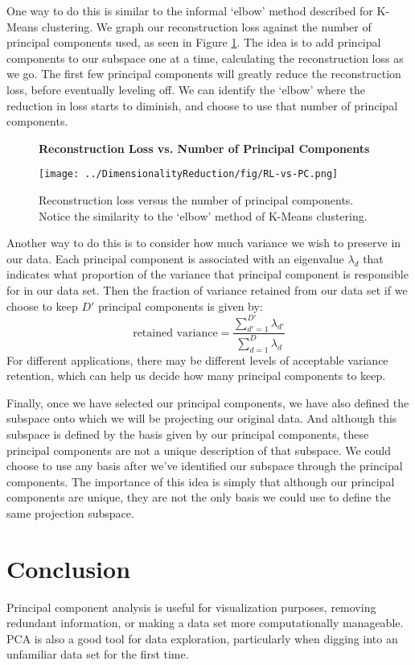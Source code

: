 One way to do this is similar to the informal `elbow' method described for K-Means clustering. We graph our reconstruction loss against the number of principal components used, as seen in Figure \ref{fig:RL-vs-PC}. The idea is to add principal components to our subspace one at a time, calculating the reconstruction loss as we go. The first few principal components will greatly reduce the reconstruction loss, before eventually leveling off. We can identify the `elbow' where the reduction in loss starts to diminish, and choose to use that number of principal components.

\begin{figure}
    \centering
    \textbf{Reconstruction Loss vs. Number of Principal Components}\par\medskip
    \texttt{[image: ../DimensionalityReduction/fig/RL-vs-PC.png]}
    \caption{Reconstruction loss versus the number of principal components. Notice the similarity to the `elbow' method of K-Means clustering.}
    \label{fig:RL-vs-PC}
\end{figure}

Another way to do this is to consider how much variance we wish to preserve in our data. Each principal component is associated with an eigenvalue $\lambda_{d}$ that indicates what proportion of the variance that principal component is responsible for in our data set. Then the fraction of variance retained from our data set if we choose to keep $D'$ principal components is given by:
\begin{equation} \label{variance-retention}
    \text{retained variance} = \frac{\sum_{d'=1}^{D'} \lambda_{d'}}{\sum_{d=1}^{D} \lambda_{d}}
\end{equation}
For different applications, there may be different levels of acceptable variance retention, which can help us decide how many principal components to keep.

Finally, once we have selected our principal components, we have also defined the subspace onto which we will be projecting our original data. And although this subspace is defined by the basis given by our principal components, these principal components are not a unique description of that subspace. We could choose to use any basis after we've identified our subspace through the principal components. The importance of this idea is simply that although our principal components are unique, they are not the only basis we could use to define the same projection subspace.

\section{Conclusion}
Principal component analysis is useful for visualization purposes, removing redundant information, or making a data set more computationally manageable. PCA is also a good tool for data exploration, particularly when digging into an unfamiliar data set for the first time.

